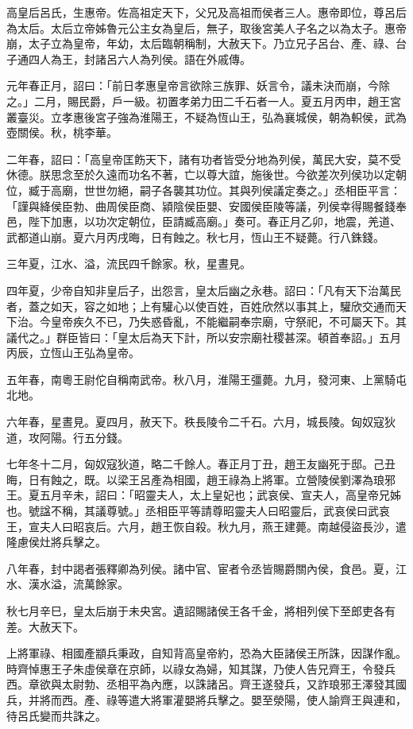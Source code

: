 
\begin{pinyinscope}
高皇后呂氏，生惠帝。佐高祖定天下，父兄及高祖而侯者三人。惠帝即位，尊呂后為太后。太后立帝姊魯元公主女為皇后，無子，取後宮美人子名之以為太子。惠帝崩，太子立為皇帝，年幼，太后臨朝稱制，大赦天下。乃立兄子呂台、產、祿、台子通四人為王，封諸呂六人為列侯。語在外戚傳。

元年春正月，詔曰：「前日孝惠皇帝言欲除三族罪、妖言令，議未決而崩，今除之。」二月，賜民爵，戶一級。初置孝弟力田二千石者一人。夏五月丙申，趙王宮叢臺災。立孝惠後宮子強為淮陽王，不疑為恆山王，弘為襄城侯，朝為軹侯，武為壺關侯。秋，桃李華。

二年春，詔曰：「高皇帝匡飭天下，諸有功者皆受分地為列侯，萬民大安，莫不受休德。朕思念至於久遠而功名不著，亡以尊大誼，施後世。今欲差次列侯功以定朝位，臧于高廟，世世勿絕，嗣子各襲其功位。其與列侯議定奏之。」丞相臣平言：「謹與絳侯臣勃、曲周侯臣商、潁陰侯臣嬰、安國侯臣陵等議，列侯幸得賜餐錢奉邑，陛下加惠，以功次定朝位，臣請臧高廟。」奏可。春正月乙卯，地震，羌道、武都道山崩。夏六月丙戌晦，日有蝕之。秋七月，恆山王不疑薨。行八銖錢。

三年夏，江水、溢，流民四千餘家。秋，星晝見。

四年夏，少帝自知非皇后子，出怨言，皇太后幽之永巷。詔曰：「凡有天下治萬民者，蓋之如天，容之如地；上有驩心以使百姓，百姓欣然以事其上，驩欣交通而天下治。今皇帝疾久不已，乃失惑昏亂，不能繼嗣奉宗廟，守祭祀，不可屬天下。其議代之。」群臣皆曰：「皇太后為天下計，所以安宗廟社稷甚深。頓首奉詔。」五月丙辰，立恆山王弘為皇帝。

五年春，南粵王尉佗自稱南武帝。秋八月，淮陽王彊薨。九月，發河東、上黨騎屯北地。

六年春，星晝見。夏四月，赦天下。秩長陵令二千石。六月，城長陵。匈奴寇狄道，攻阿陽。行五分錢。

七年冬十二月，匈奴寇狄道，略二千餘人。春正月丁丑，趙王友幽死于邸。己丑晦，日有蝕之，既。以梁王呂產為相國，趙王祿為上將軍。立營陵侯劉澤為琅邪王。夏五月辛未，詔曰：「昭靈夫人，太上皇妃也；武哀侯、宣夫人，高皇帝兄姊也。號諡不稱，其議尊號。」丞相臣平等請尊昭靈夫人曰昭靈后，武哀侯曰武哀王，宣夫人曰昭哀后。六月，趙王恢自殺。秋九月，燕王建薨。南越侵盜長沙，遣隆慮侯灶將兵擊之。

八年春，封中謁者張釋卿為列侯。諸中官、宦者令丞皆賜爵關內侯，食邑。夏，江水、漢水溢，流萬餘家。

秋七月辛巳，皇太后崩于未央宮。遺詔賜諸侯王各千金，將相列侯下至郎吏各有差。大赦天下。

上將軍祿、相國產顓兵秉政，自知背高皇帝約，恐為大臣諸侯王所誅，因謀作亂。時齊悼惠王子朱虛侯章在京師，以祿女為婦，知其謀，乃使人告兄齊王，令發兵西。章欲與太尉勃、丞相平為內應，以誅諸呂。齊王遂發兵，又詐琅邪王澤發其國兵，并將而西。產、祿等遣大將軍灌嬰將兵擊之。嬰至滎陽，使人諭齊王與連和，待呂氏變而共誅之。


\end{pinyinscope}
